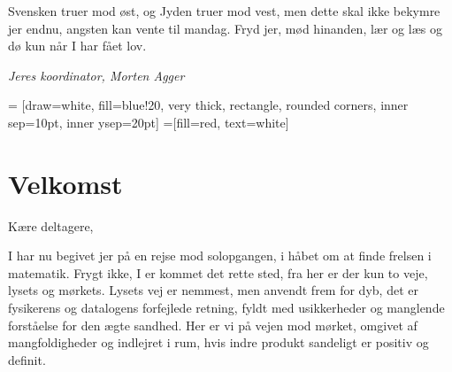 \documentclass[article,10pt,a4,oneside]{memoir}
\begin{document}
\begin{minipage}[b]{0.95\textwidth}
\begin{minipage}[t]{0.47\textwidth}
Svensken truer mod øst, og Jyden truer mod vest, men dette skal ikke bekymre jer endnu, angsten kan vente til mandag. Fryd jer, mød hinanden, lær og læs og dø kun når I har fået lov. 

{\flushright\emph{Jeres koordinator, Morten Agger}}

\end{minipage}
\hfill\begin{minipage}[t]{0.47\textwidth}

\vspace{1mm}
 = [draw=white, fill=blue!20, very thick,
    rectangle, rounded corners, inner sep=10pt, inner ysep=20pt]
 =[fill=red, text=white]

%

\section*{Velkomst}
Kære deltagere,

I har nu begivet jer på en rejse mod solopgangen, i håbet om at finde frelsen i matematik. Frygt ikke, I er kommet det rette sted, fra her er der kun to veje, lysets og mørkets. Lysets vej er nemmest, men anvendt frem for dyb, det er fysikerens og datalogens forfejlede retning, fyldt med usikkerheder og manglende forståelse for den ægte sandhed. Her er vi på vejen mod mørket, omgivet af mangfoldigheder og indlejret i rum, hvis indre produkt sandeligt er positiv og definit.


\end{minipage}
\end{minipage}
\end{document}
